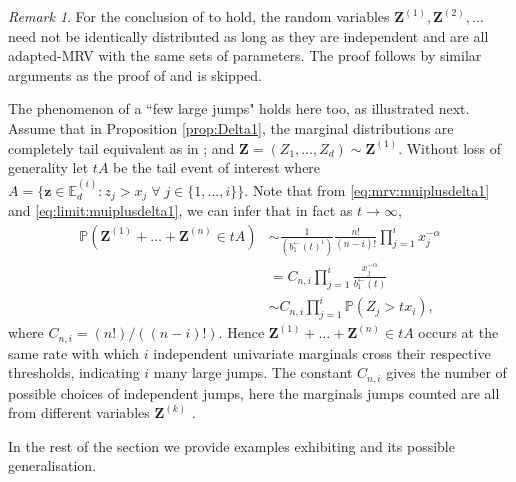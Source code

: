 \documentclass[aos]{imsart}
\numberwithin{equation}{section}
\theoremstyle{plain} %
\theoremstyle{remark}
\newtheorem{remark}[theorem]{Remark}
\newcommand{\E}{\mathbb{E}}
\renewcommand\P{\mathbb{P}}
\newcommand{\VF}[1]{{\color{blue} #1}}
\def\bZ{\boldsymbol Z}
\def\bz{\boldsymbol z}
\begin{document}
\begin{remark}\label{rem2:delta1}
For the conclusion of  to hold,
the random variables $\bZ^{(1)}, \bZ^{(2)},\ldots$ need not be identically distributed as long as they are independent and are all adapted-MRV with the same sets of parameters. The proof follows by similar arguments as the proof of  and is skipped.
\end{remark}

 The phenomenon of a ``few large jumps" holds here too, as illustrated next. Assume that in Proposition \ref{prop:Delta1}, the marginal distributions are completely tail equivalent as in ; and $\bZ=(Z_{1},\ldots,Z_{d})\sim \bZ^{(1)}$. Without loss of generality let $tA$ be the tail event of interest where $A=\{\bz\in \E_d^{(i)}:z_j>x_j\; \forall\; j\in\{1,\ldots, i\}\}$. Note that from \eqref{eq:mrv:muiplusdelta1} and \eqref{eq:limit:muiplusdelta1}, we can infer that in fact as $t\to \infty$,
\begin{align*}
\P(\bZ^{(1)}+\ldots+\bZ^{(n)} \in tA) & \sim \frac{1}{(b_1^{\leftarrow}(t)^{i})}
\frac{n!}{(n-i)!} \prod_{j=1}^i x_j^{-\alpha}\\
        & = C_{n,i}  \prod_{j=1}^i \frac{x_j^{-\alpha}}{b_1^{\leftarrow}(t)} \\
        &\sim C_{n,i}  \prod_{j=1}^i \P(Z_{j}>tx_i),
\end{align*}
where $C_{n,i}= (n!)/((n-i)!)$. Hence $\bZ^{(1)}+\ldots+\bZ^{(n)} \in tA$ occurs at the same rate with which  $i$ independent univariate marginals cross their respective thresholds, indicating $i$ many large jumps. The constant $C_{n,i}$ gives the number of possible choices of independent jumps, here the marginals jumps counted are all from different variables $\bZ^{(k)}$ .


In the rest of the section we provide examples exhibiting  and its possible generalisation.
\end{document}
